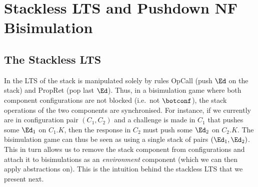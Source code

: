 
  \section{Stackless LTS and Pushdown NF Bisimulation}
  \label{sec:stackless-lts}
\renewcommand{\pconf}[4]
{\ma{\color{blue}\llparenthesis\color{black} #2 \mathop{;} #3 \mathop{;} #4 \color{blue}\rrparenthesis\color{black}}
}
\renewcommand{\oconf}[4]
{\ma{\color{red}\llparenthesis\color{black} #2 \mathop{;} {#3} \mathop{;} #4 \color{red}\rrparenthesis\color{black}}
}
\newcommand{\cconf}[4]{\ma{\llparenthesis  #2 \mathop{;} #3 \mathop{;} #4 \rrparenthesis}}
\newcommand\botcconf{\ma{\llparenthesis\bot\rrparenthesis}}
\newcommand{\betais}[1]{\ulcorner #1 \urcorner}
\newcommand{\betaisR}[2]{\llcorner #1 \lrcorner_{#2}}
\newcommand{\ocalls}[1]{\ma{\mathsf{ocalls}(#1)}}
\newcommand\transNR[1]{\trans[{\sf NR}]{#1}}
\newcommand\wtransNR[1]{\wtrans[{\sf NR}]{#1}}
\newcommand\transsNR[1]{\transs[{\sf NR}]{#1}}
\newcommand\similNR{\simil_{\sf NR}}
\newcommand\bisimilNR{\ma{\approx_{\sf NR}}}
\newcommand\realtransNR[1]{\realtrans[{\sf NR}]{#1}}
\newcommand\sigb{_{\Sigma,\beta}}
\newcommand\sigbr{_{\Sigma^{-1},\beta^{-1}}}
\newcommand\sigbrp{_{\Sigma^{-1},\beta'^{-1}}}
\newcommand\sigbb{_{\Sigma',\beta'}}
\newcommand\leftdiverge{\bisim*R_{\uparrow\bot}}
\newcommand\Kont{\mathsf{Kont}}
\newcommand\bisimilPD{\bisimil_{\mathsf{PD}}}
\newcommand\toSig[2][\Sigma]{\mathrel{\trans{#2}_{#1}}}
\newcommand\toSigs[2][\Sigma]{\mathrel{\transs{#2}_{#1}}}
\newcommand\toSigsD[2][\Sigma]{\mathrel{\transs{#2}_{#1}}\!\diamond}

\subsection{The Stackless LTS}\label{sec:the-stackless-lts}
In the LTS of  the stack is manipulated solely by rules
{\sc OpCall} (push $\Ed$ on the stack) and {\sc PropRet} (pop last $\Ed$). Thus, in a bisimulation game where both component configurations are not blocked (i.e.\ not $\botconf$), the stack operations of the two components are synchronised. For instance, if we currently are in configuration pair $(C_1,C_2)$ and a challenge is made in $C_1$ that pushes some $\Ed_1$ on $C_1.K$, then the response in $C_2$ must push some $\Ed_2$ on $C_2.K$. The bisimulation game can thus be seen as using a single stack of pairs $(\Ed_1,\Ed_2)$. This in turn allows us to remove the stack component from configurations and attach it to bisimulations as an \emph{environment} component (which we can then apply abstractions on). This is the intuition behind the stackless LTS that we present next.

